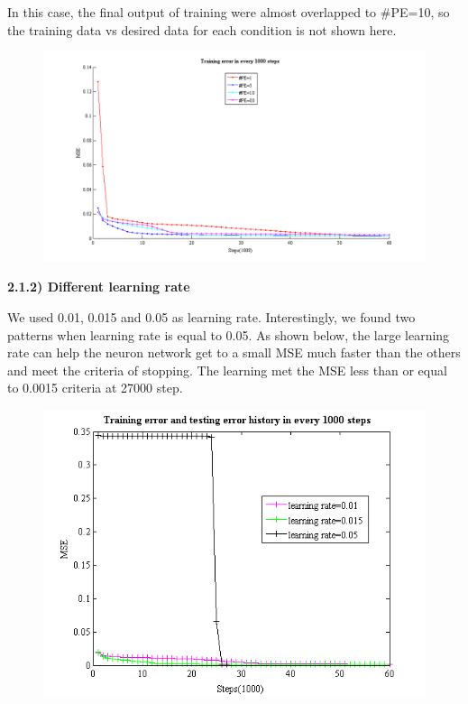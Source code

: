\documentclass[epsfig]{article}
\def\bpar{\vskip26pt}
\def\npar{\vskip13pt}
\begin{document}
In this case, the final output of training were almost overlapped to $\#$PE=10, so the training data vs desired data for each condition is not shown here.

\begin{figure}[H] 
\centering\includegraphics[width=6.5in]{errPE.png} 
\end{figure} 



{\bf 
\npar
2.1.2) Different learning rate 
\bpar
}

We used 0.01, 0.015 and 0.05 as learning rate. Interestingly, we found two patterns when learning rate is equal to 0.05. As shown below, the large learning rate can help the neuron network get to a small MSE much faster than the others and meet the criteria of stopping. The learning met the MSE less than or equal to 0.0015 criteria at 27000 step.

\begin{figure}[H] 
\centering\includegraphics[width=4.5in]{lr_err1.png} 
\end{figure} 
\end{document}
